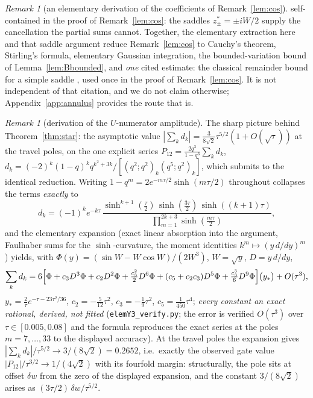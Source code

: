\documentclass[11pt]{article}
\theoremstyle{plain}
\theoremstyle{definition}
\theoremstyle{remark}
\newtheorem{remark}[theorem]{Remark}
\begin{document}
\begin{remark}[an elementary derivation of the coefficients of Remark~\ref{lem:cos}]
self-contained in the proof of Remark~\ref{lem:cos}: the saddles $z^\ast_\pm=\pm iW/2$ supply the
cancellation the partial sums cannot. Together, the elementary extraction here and that saddle argument reduce
Remark~\ref{lem:cos} to Cauchy's theorem, Stirling's formula, elementary Gaussian integration, the
bounded-variation bound of Lemma~\ref{lem:Bbounded}, and \emph{one} cited estimate: the classical
remainder bound for a simple saddle \cite[Ch.~4, Thm.~7.1]{Olver}, used once in the proof of
Remark~\ref{lem:cos}. It is not independent of that citation, and we do not claim otherwise;
Appendix~\ref{app:annulus} provides the route that is.
\end{remark}

\begin{remark}[derivation of the $U$-numerator amplitude]\label{rem:elemY3}
The sharp picture behind Theorem~\ref{thm:star}: the asymptotic value
$|\sum_kd_k|=\tfrac3{8\sqrt2}\tau^{5/2}(1+O(\sqrt\tau))$ at the travel poles, on the one explicit
series $P_{12}=\tfrac{2q^3}{1-q^3}\sum_kd_k$,
$d_k=(-2)^k(1-q)^kq^{k^2+3k}/[(q^2;q^2)_k(q^5;q^2)_k]$, which submits to the identical reduction. Writing
$1-q^m=2e^{-m\tau/2}\sinh(m\tau/2)$ throughout collapses the terms \emph{exactly} to
\[
   d_k=(-1)^k e^{-k\tau}\,
   \frac{\sinh^{k+1}(\tfrac\tau2)\,\sinh(\tfrac{3\tau}2)\,\sinh((k{+}1)\tau)}
        {\prod_{m=1}^{2k+3}\sinh(\tfrac{m\tau}2)},
\]
and the elementary expansion (exact linear absorption into the argument, Faulhaber sums for the
$\sinh$-curvature, the moment identities $k^m\mapsto(y\,d/dy)^m$) yields, with
$\Phi(y)=(\sin W-W\cos W)/(2W^3)$, $W=\sqrt y$, $D=y\,d/dy$,
\[
   \sum_kd_k=6\Bigl[\Phi+c_3D^3\Phi+c_2D^2\Phi+\tfrac{c_3^2}2D^6\Phi
   +(c_5+c_2c_3)D^5\Phi+\tfrac{c_3^3}6D^9\Phi\Bigr]\bigl(y_*\bigr)+O(\tau^3),
\]
$y_*=\tfrac2\tau e^{-\tau-23\tau^2/36}$, $c_2=-\tfrac5{12}\tau^2$, $c_3=-\tfrac19\tau^2$,
$c_5=\tfrac1{450}\tau^4$; \emph{every constant an exact rational, derived, not fitted}
(\texttt{elemY3\_verify.py}; the error is verified $O(\tau^3)$ over $\tau\in[0.005,0.08]$ and the formula
reproduces the exact series at the poles $m=7,\dots,33$ to the displayed accuracy). At the travel poles the
expansion gives $|\sum_kd_k|/\tau^{5/2}\to3/(8\sqrt2)=0.2652$, i.e.\ exactly the observed gate value
$|P_{12}|/\tau^{3/2}\to1/(4\sqrt2)$ with its fourfold margin: structurally, the pole sits at offset
$\delta w$ from the zero of the displayed expansion, and the constant $3/(8\sqrt2)$ arises as
$(3\tau/2)\,\delta w/\tau^{5/2}$.


\end{remark}
\end{document}
